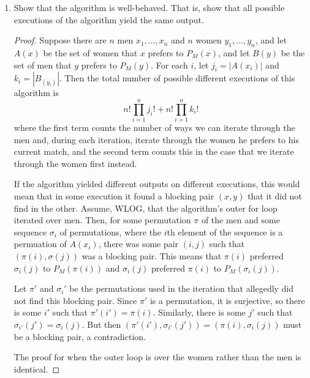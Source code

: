 \documentclass[10pt]{article}
\begin{document}
\begin{enumerate}
\begin{enumerate}
\begin{proof}
The outer for loop will have $n$ iterations, no matter what.  Each inner for loop will have $k$ iterations, where $k$ is the number of women that $x$ prefers to his current match.  The highest possible value $k$ can take is $n-1$, which occurs in the case that $x$ is paired with his least favorite woman.  So the worst case runtime is $O(n(n-1))$, thus the algorithm terminates.
\end{proof}

\item Show that the algorithm is well-behaved.  That is, show that all possible executions of the algorithm yield the same output.

\begin{proof}
Suppose there are $n$ men $x_1, \dots , x_n$ and $n$ women $y_1, \dots , y_n$, and let $A(x)$ be the set of women that $x$ prefers to $P_M(x)$, and let $B(y)$ be the set of men that $y$ prefers to $P_M(y)$.  For each $i$, let $j_i = |A(x_i)|$ and $k_i = |B_(y_i)|$.  Then the total number of possible different executions of this algorithm is $$n!\prod_{i = 1}^n j_i! + n!\prod_{i = 1}^n k_i!$$
where the first term counts the number of ways we can iterate through the men and, during each iteration, iterate through the women he prefers to his current match, and the second term counts this in the case that we iterate through the women first instead.

If the algorithm yielded different outputs on different executions, this would mean that in some execution it found a blocking pair $(x,y)$ that it did not find in the other.  Assume, WLOG, that the algorithm's outer for loop iterated over men.  Then, for some permutation $\pi$ of the men and some sequence $\sigma_i$ of permutations, where the $i$th element of the sequence is a permuation of $A(x_i)$, there was some pair $(i,j)$ such that $(\pi(i), \sigma(j))$ was a blocking pair.  This means that $\pi(i)$ preferred $\sigma_i(j)$ to $P_M(\pi(i))$ and $\sigma_i(j)$ preferred $\pi(i)$ to $P_M(\sigma_i(j))$.

Let $\pi'$ and $\sigma_i'$ be the permutations used in the iteration that allegedly did not find this blocking pair.  Since $\pi'$ is a permutation, it is surjective, so there is some $i'$ such that $\pi'(i') = \pi(i)$.  Similarly, there is some $j'$ such that $\sigma_{i'}(j') = \sigma_i(j)$.  But then $(\pi'(i'),\sigma_{i'}(j')) = (\pi(i),\sigma_i(j))$ must be a blocking pair, a contradiction.

The proof for when the outer loop is over the women rather than the men is identical.
\end{proof}


\end{enumerate}
\end{enumerate}
\end{document}
